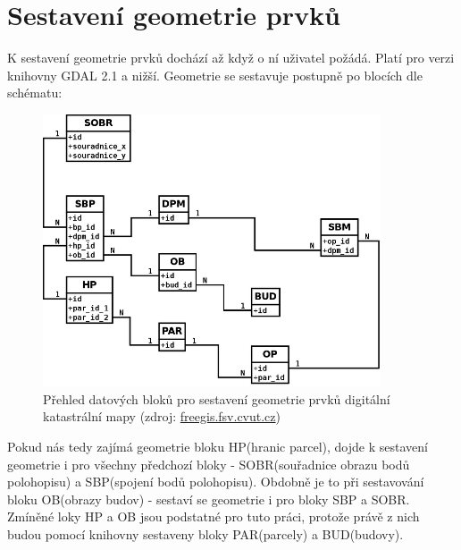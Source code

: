 \section{Sestavení geometrie prvků}
K sestavení geometrie prvků dochází až když o ní uživatel požádá. Platí pro verzi knihovny GDAL 2.1 a nižší. Geometrie se sestavuje postupně po blocích dle schématu:
\begin{figure}[H]
	 \centering
      \includegraphics[width=10cm]{./pictures/Vfk-diagram-geom.png}
      \caption{Přehled datových bloků pro sestavení geometrie prvků digitální katastrální mapy (zdroj:
      \href{http://freegis.fsv.cvut.cz/wiki/images/thumb/8/8a/Vfk-diagram-geom.png/744px-Vfk-diagram-geom.png}{freegis.fsv.cvut.cz})}
      \label{fig:vfk diagram geom}
  \end{figure}
Pokud nás tedy zajímá geometrie bloku HP(hranic parcel), dojde k sestavení geometrie i pro všechny předchozí bloky - SOBR(souřadnice obrazu bodů polohopisu) a SBP(spojení bodů polohopisu). Obdobně je to při sestavování bloku OB(obrazy budov) - sestaví se geometrie i pro bloky SBP a SOBR. Zmíněné loky HP a OB jsou podstatné pro tuto práci, protože právě z nich budou pomocí knihovny sestaveny bloky PAR(parcely) a BUD(budovy).
